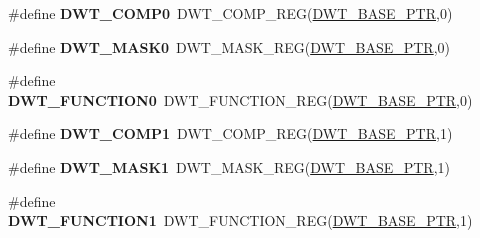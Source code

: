 \begin{DoxyCompactItemize}
\item 
\hypertarget{group___d_w_t___register___accessor___macros_ga9db318dc9c17c0becfe355975b97af1d}{}\#define {\bfseries D\+W\+T\+\_\+\+C\+O\+M\+P0}~D\+W\+T\+\_\+\+C\+O\+M\+P\+\_\+\+R\+E\+G(\hyperlink{group___d_w_t___peripheral_ga3b46dfb2ea7946c6938028d879c82cb1}{D\+W\+T\+\_\+\+B\+A\+S\+E\+\_\+\+P\+T\+R},0)\label{group___d_w_t___register___accessor___macros_ga9db318dc9c17c0becfe355975b97af1d}

\item 
\hypertarget{group___d_w_t___register___accessor___macros_ga6eb360c4a4139093831957c762570597}{}\#define {\bfseries D\+W\+T\+\_\+\+M\+A\+S\+K0}~D\+W\+T\+\_\+\+M\+A\+S\+K\+\_\+\+R\+E\+G(\hyperlink{group___d_w_t___peripheral_ga3b46dfb2ea7946c6938028d879c82cb1}{D\+W\+T\+\_\+\+B\+A\+S\+E\+\_\+\+P\+T\+R},0)\label{group___d_w_t___register___accessor___macros_ga6eb360c4a4139093831957c762570597}

\item 
\hypertarget{group___d_w_t___register___accessor___macros_ga30eda8435a349787bc0ce7364059c42a}{}\#define {\bfseries D\+W\+T\+\_\+\+F\+U\+N\+C\+T\+I\+O\+N0}~D\+W\+T\+\_\+\+F\+U\+N\+C\+T\+I\+O\+N\+\_\+\+R\+E\+G(\hyperlink{group___d_w_t___peripheral_ga3b46dfb2ea7946c6938028d879c82cb1}{D\+W\+T\+\_\+\+B\+A\+S\+E\+\_\+\+P\+T\+R},0)\label{group___d_w_t___register___accessor___macros_ga30eda8435a349787bc0ce7364059c42a}

\item 
\hypertarget{group___d_w_t___register___accessor___macros_ga8e44e4906dfeed39288b3b71d78ab015}{}\#define {\bfseries D\+W\+T\+\_\+\+C\+O\+M\+P1}~D\+W\+T\+\_\+\+C\+O\+M\+P\+\_\+\+R\+E\+G(\hyperlink{group___d_w_t___peripheral_ga3b46dfb2ea7946c6938028d879c82cb1}{D\+W\+T\+\_\+\+B\+A\+S\+E\+\_\+\+P\+T\+R},1)\label{group___d_w_t___register___accessor___macros_ga8e44e4906dfeed39288b3b71d78ab015}

\item 
\hypertarget{group___d_w_t___register___accessor___macros_gad658f7a25b44d3be3ceeba8ef070b918}{}\#define {\bfseries D\+W\+T\+\_\+\+M\+A\+S\+K1}~D\+W\+T\+\_\+\+M\+A\+S\+K\+\_\+\+R\+E\+G(\hyperlink{group___d_w_t___peripheral_ga3b46dfb2ea7946c6938028d879c82cb1}{D\+W\+T\+\_\+\+B\+A\+S\+E\+\_\+\+P\+T\+R},1)\label{group___d_w_t___register___accessor___macros_gad658f7a25b44d3be3ceeba8ef070b918}

\item 
\hypertarget{group___d_w_t___register___accessor___macros_ga6e512f90919120ad3ecf145caafef873}{}\#define {\bfseries D\+W\+T\+\_\+\+F\+U\+N\+C\+T\+I\+O\+N1}~D\+W\+T\+\_\+\+F\+U\+N\+C\+T\+I\+O\+N\+\_\+\+R\+E\+G(\hyperlink{group___d_w_t___peripheral_ga3b46dfb2ea7946c6938028d879c82cb1}{D\+W\+T\+\_\+\+B\+A\+S\+E\+\_\+\+P\+T\+R},1)\label{group___d_w_t___register___accessor___macros_ga6e512f90919120ad3ecf145caafef873}


\end{DoxyCompactItemize}
